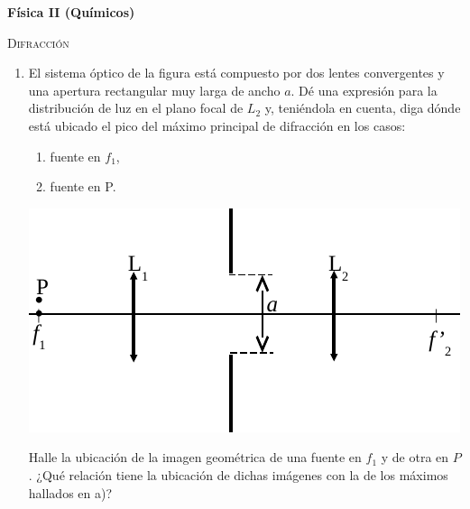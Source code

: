 \documentclass[11pt,spanish,a4paper]{article}
\begin{document}
\noindent
\textbf{Física II (Químicos)}\hfill {}
\begin{center}
  \textsc{\large Difracción}
\par\end{center}{\large \par}


\begin{enumerate}

\section*{Rendija única}

\item
\begin{minipage}[t]{0.55\textwidth}
El sistema óptico de la figura está compuesto por dos lentes convergentes y una apertura rectangular muy larga de ancho \(a\).
Dé una expresión para la distribución de luz en el plano focal de \(L_2\) y, teniéndola en cuenta, diga dónde está ubicado el pico del máximo principal de difracción en los casos:
\begin{enumerate}
	\item fuente en \(f_1\),
	\item fuente en P.
\end{enumerate}
\end{minipage}
\begin{minipage}[c][1em][t]{0.35\textwidth}
    \includegraphics[width=\textwidth]{g09e01}
\end{minipage}

Halle la ubicación de la imagen geométrica de una fuente en \(f_1\) y de otra en \(P\).
¿Qué relación tiene la ubicación de dichas imágenes con la de los máximos hallados en a)?




\end{enumerate}
\end{document}
